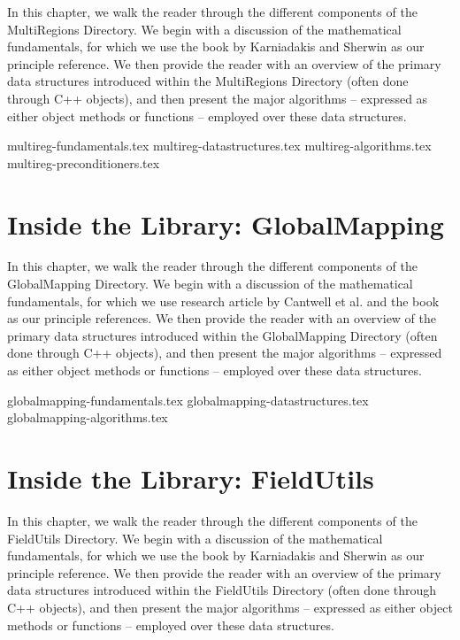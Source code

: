 In this chapter, we walk the reader through the different components
of the MultiRegions Directory.  We begin with a discussion of the
mathematical fundamentals, for which we use the book by Karniadakis
and Sherwin \cite{KaSh05} as our principle reference.  We then provide
the reader with an overview of the primary data structures introduced
within the MultiRegions Directory (often done through C++ objects),
and then present the major algorithms -- expressed as either object
methods or functions -- employed over these data structures.

{multireg-fundamentals.tex}
%
{multireg-datastructures.tex}
%
{multireg-algorithms.tex}
%
{multireg-preconditioners.tex}



\chapter{Inside the Library: GlobalMapping}
\label{chapter:globalmapping}

In this chapter, we walk the reader through the different components
of the GlobalMapping Directory.  We begin with a discussion of the
mathematical fundamentals, for which we use research article by
Cantwell et al. \cite{CantwellYKPS14} and the book \cite{Ar89} as our
principle references.  We then provide the reader with an overview of
the primary data structures introduced within the GlobalMapping
Directory (often done through C++ objects), and then present the major
algorithms -- expressed as either object methods or functions --
employed over these data structures.

{globalmapping-fundamentals.tex}
%
{globalmapping-datastructures.tex}
%
{globalmapping-algorithms.tex}


\chapter{Inside the Library: FieldUtils}

In this chapter, we walk the reader through the different components of the FieldUtils Directory.
We begin with a discussion of the mathematical fundamentals, for which we use the book
by Karniadakis and Sherwin \cite{KaSh05} as our principle reference.  We then provide
the reader with an overview of the primary data structures introduced within the
FieldUtils Directory (often done through C++ objects), and then present the major
algorithms -- expressed as either object methods or functions -- employed over these data structures.


